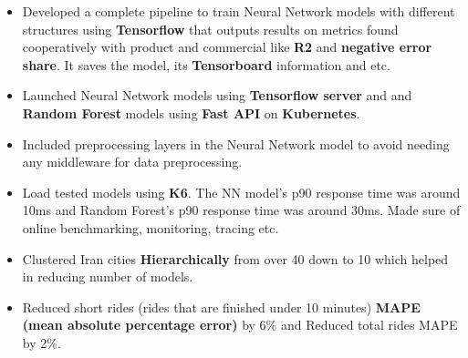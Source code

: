 {\begin{itemize}[label=\textbullet]
            \item Developed a complete pipeline to train Neural Network models with different structures using \textbf{Tensorflow} that outputs results on metrics found cooperatively with product and commercial like \textbf{R2} and \textbf{negative error share}. It saves the model, its \textbf{Tensorboard} information and etc.
            \item Launched Neural Network models using \textbf{Tensorflow server} and and \textbf{Random Forest} models using \textbf{Fast API} on \textbf{Kubernetes}.
            \item Included preprocessing layers in the Neural Network model to avoid needing any middleware for data preprocessing.
            \item Load tested models using \textbf{K6}. The NN model's p90 response time was around 10ms and Random Forest's p90 response time was around 30ms. Made sure of online benchmarking, monitoring, tracing etc.
            \item Clustered Iran cities \textbf{Hierarchically} from over 40 down to 10 which helped in reducing number of models.
            \item Reduced short rides (rides that are finished under 10 minutes) \textbf{MAPE (mean absolute percentage error)} by 6\% and Reduced total rides MAPE by 2\%.
      \end{itemize}
}

\vspace{.5cm}

